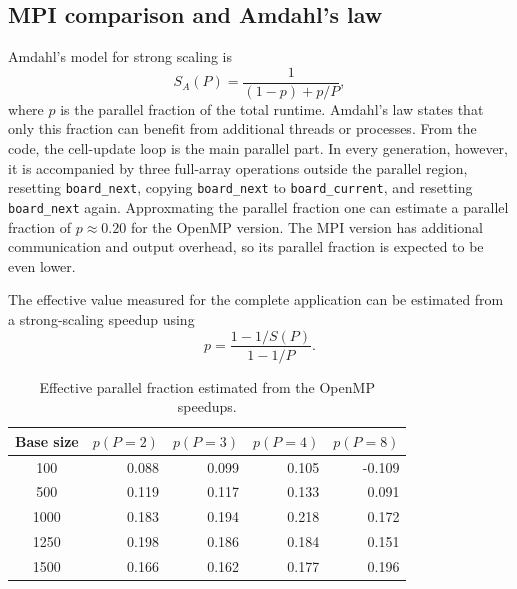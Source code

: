 \documentclass[11pt,a4paper]{article}
\begin{document}
\subsection{MPI comparison and Amdahl's law}
Amdahl's model for strong scaling is
\begin{equation}
    S_A(P)=\frac{1}{(1-p)+p/P},
\end{equation}
where $p$ is the parallel fraction of the total runtime. Amdahl's law states
that only this fraction can benefit from additional threads or processes. From
the code, the cell-update loop is the main parallel part. In every generation,
however, it is accompanied by three full-array operations outside the parallel
region, resetting \texttt{board\_next}, copying \texttt{board\_next} to
\texttt{board\_current}, and resetting \texttt{board\_next} again. Approxmating 
the parallel fraction one can estimate a parallel fraction of $p \approx 0.20$ 
for the OpenMP version. The MPI version has additional communication and output 
overhead, so its parallel fraction is expected to be even lower.

The effective value measured for the complete application can be estimated
from a strong-scaling speedup using
\begin{equation}
    p=\frac{1-1/S(P)}{1-1/P}.
\end{equation}

\begin{table}[ht]
    \centering
    \caption{Effective parallel fraction estimated from the OpenMP speedups.}
    \label{tab:openmp-p}
    \begin{tabular}{c|rrrr}
        \toprule
        Base size & $p(P=2)$ & $p(P=3)$ & $p(P=4)$ & $p(P=8)$ \\
        \midrule
        100  & 0.088 & 0.099 & 0.105 & -0.109 \\
        500  & 0.119 & 0.117 & 0.133 &  0.091 \\
        1000 & 0.183 & 0.194 & 0.218 &  0.172 \\
        1250 & 0.198 & 0.186 & 0.184 &  0.151 \\
        1500 & 0.166 & 0.162 & 0.177 &  0.196 \\
        \bottomrule
    \end{tabular}
\end{table}
\end{document}
